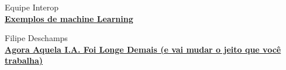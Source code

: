 \documentclass{article}
\begin{document}
    \newpage

    \begin{thebibliography}{2}
        Equipe Interop \\
        \href{https://www.interop.com.br/blog/exemplos-de-machine-learning/}{\textbf{Exemplos de machine Learning}} 
        
        Filipe Deschamps \\
        \href{https://www.interop.com.br/blog/exemplos-de-machine-learning/}{\textbf{Agora Aquela I.A. Foi Longe Demais (e vai mudar o jeito que você trabalha)}} 
    \end{thebibliography}

    
\end{document}
